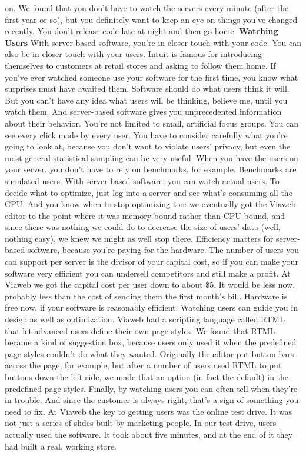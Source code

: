 on.  We found that you don't have to watch the servers every minute
(after the first year or so), but you definitely want to keep an
eye on things you've changed recently.  You don't release code late
at night and then go home.
\textbf{Watching Users}
With server-based software, you're in closer touch with your code.
You can also be in closer touch with your users.  Intuit is famous
for introducing themselves to customers at retail stores and asking
to follow them home.  If you've ever watched someone use your
software for the first time, you know what surprises must have
awaited them.
Software should do what users think it will.  But you can't have
any idea what users will be thinking, believe me, until you watch
them.  And server-based software gives you unprecedented information
about their behavior.  You're not limited to small, artificial
focus groups.  You can see every click made by every user.  You
have to consider carefully what you're going to look at, because
you don't want to violate users' privacy, but even the most general
statistical sampling can be very useful.
When you have the users on your server, you don't have to rely on
benchmarks, for example.  Benchmarks are simulated users.  With
server-based software, you can watch actual users.  To decide what
to optimize, just log into a server and see what's consuming all
the CPU.  And you know when to stop optimizing too: we eventually
got the Viaweb editor to the point where it was memory-bound rather
than CPU-bound, and since there was nothing we could do to decrease
the size of users' data (well, nothing easy), we knew we might as
well stop there.
Efficiency matters for server-based software, because you're paying
for the hardware.  The number of users you can support per server
is the divisor of your capital cost, so if you can make your software
very efficient you can undersell competitors and still make a
profit.  At Viaweb we got the capital cost per user down to about
\$5.  It would be less now, probably less than the cost of sending
them the first month's bill.  Hardware is free now, if your software
is reasonably efficient.
Watching users can guide you in design as well as optimization.
Viaweb had a scripting language called RTML that let advanced users
define their own page styles.  We found that RTML became a kind of
suggestion box, because users only used it when the predefined page
styles couldn't do what they wanted.  Originally the editor put
button bars across the page, for example, but after a number of
users used RTML to put buttons down the left 
\href{https://sep.turbifycdn.com/ca/I/paulgraham\_1656\_3563}{side}, 
we made that an
option (in fact the default) in the predefined page styles.
Finally, by watching users you can often tell when they're in
trouble.  And since the customer is always right, that's a sign of
something you need to fix.  At Viaweb the key to getting users was
the online test drive.  It was not just a series of slides built
by marketing people.  In our test drive, users actually used the
software.  It took about five minutes, and at the end of it they
had built a real, working store.

